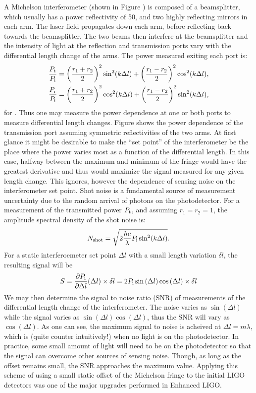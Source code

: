 A Michelson interferometer (shown in Figure ) is composed of a beamsplitter, which usually has a power reflectivity of 50\perc{}, and two highly reflecting mirrors in each arm. %
The laser field propagates down each arm, before reflecting back towards the beamsplitter. %
The two beams then interfere at the beamsplitter and the intensity of light at the reflection and transmission ports vary with the differential length change of the arms. %
The power measured exiting each port is:
\begin{align}
\frac{P_{\rm{t}}}{P_{\rm{i}}} &= \left(\frac{r_1+r_2}{2}\right)^2\sin^2(k\Delta l)+\left(\frac{r_1-r_2}{2}\right)^2\cos^2(k\Delta l),\\
\frac{P_{\rm{r}}}{P_{\rm{i}}} &= \left(\frac{r_1+r_2}{2}\right)^2\cos^2(k\Delta l)+\left(\frac{r_1-r_2}{2}\right)^2\sin^2(k\Delta l),
\end{align}
for . %
Thus one may measure the power dependence at one or both ports to measure differential length changes. %
Figure  shows the power dependence of the transmission port assuming symmetric reflectivities of the two arms. %
At first glance it might be desirable to make the ``set point'' %
of the interferometer be the place where the power varies most as a function of the differential length. %
In this case, halfway between the maximum and minimum of the fringe would have the greatest derivative and thus would maximize the signal measured for any given length change. %
This ignores, however the dependence of sensing noise on the interferometer set point. %
Shot noise is a fundamental source of measurement uncertainty due to the random arrival of photons on the photodetector. %
For a measurement of the transmitted power $P_{\rm t}$, and assuming $r_1=r_2=1$, the amplitude spectral density of the shot noise is:
\begin{equation}
N_{\rm{shot}}=\sqrt{2\frac{hc}{\lambda}P_{\rm i}\sin^2(k\Delta l)}.
\end{equation}
For a static interferoemeter set point $\Delta l$ with a small length variation $\delta l$, the resulting signal will be
\begin{equation}
S=\frac{\partial P_{\rm i}}{\partial \Delta l}(\Delta l) \times \delta l = 2P_{\rm i}\sin{(\Delta l)}\cos{(\Delta l)}\times \delta l
\end{equation}
We may then determine the signal to noise ratio (SNR) of measurements of the differential length change of the interferometer. %
The noise varies as $\sin(\Delta l)$ while the signal varies as $\sin(\Delta l)\cos(\Delta l)$, thus the SNR will vary as $\cos(\Delta l)$. %
As one can see, the maximum signal to noise is acheived at $\Delta l = m \lambda$, which is (quite counter intuitively!) when no light is on the photodetector. %
In practice, some small amount of light will need to be on the photodetector so that the signal can overcome other sources of sensing noise. %
Though, as long as the offset remains small, the SNR approaches the maximum value. %
Applying this scheme of using a small static offset of the Michelson fringe to the initial LIGO detectors was one of the major upgrades performed in Enhanced LIGO.

